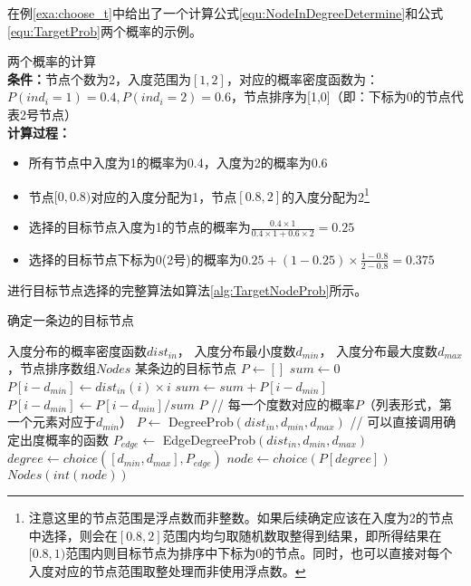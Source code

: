 \vspace{0.2cm}

在例\ref{exa:choose_t}中给出了一个计算公式\ref{equ:NodeInDegreeDetermine}和公式\ref{equ:TargetProb}两个概率的示例。

\begin{example}
  \label{exa:choose_t}
  两个概率的计算\\
  \textbf{条件：}节点个数为2，入度范围为$[1,2]$，对应的概率密度函数为：$P(ind_i=1)=0.4, P(ind_i=2)=0.6$，节点排序为[1,0]（即：下标为0的节点代表2号节点）\\
  \textbf{计算过程：}
  \begin{itemize}
    \item 所有节点中入度为1的概率为0.4，入度为2的概率为0.6
    \item 节点$[0, 0.8)$对应的入度分配为1，节点$[0.8,2]$的入度分配为2\footnote{注意这里的节点范围是浮点数而非整数。如果后续确定应该在入度为2的节点中选择，则会在$[0.8,2]$范围内均匀取随机数取整得到结果，即所得结果在$[0.8,1)$范围内则目标节点为排序中下标为0的节点。同时，也可以直接对每个入度对应的节点范围取整处理而非使用浮点数。}
    \item 选择的目标节点入度为1的节点的概率为$\frac {0.4\times 1}{0.4\times 1 + 0.6\times 2}=0.25$
    \item 选择的目标节点下标为0(2号)的概率为$0.25 + (1-0.25)\times\frac{1-0.8}{2-0.8}=0.375$
  \end{itemize}
\end{example}

进行目标节点选择的完整算法如算法\ref{alg:TargetNodeProb}所示。

\begin{algorithm}[htb]
  \caption{确定一条边的目标节点}
  \label{alg:TargetNodeProb}
  \begin{algorithmic}[1]
    \Require
      入度分布的概率密度函数$dist_{in}$，
      入度分布最小度数$d_{min}$，
      入度分布最大度数$d_{max}$，节点排序数组$Nodes$
    \Ensure 某条边的目标节点
      \State $P \gets []$
      \State $sum \gets 0$
        \State $P[i - d_{min}] \gets dist_{in}(i) \times i$
        \State $sum \gets sum + P[i - d_{min}]$
      \EndFor
        \State $P[i - d_{min}] \gets P[i - d_{min}] / sum$
      \EndFor
      \State \Return $P$ // 每一个度数对应的概率$P$（列表形式，第一个元素对应于$d_{min}$）
    \EndFunction
    \State $P \gets$ DegreeProb$(dist_{in}, d_{min}, d_{max})$ // 可以直接调用确定出度概率的函数
    \State $P_{edge} \gets$ EdgeDegreeProb$(dist_{in}, d_{min}, d_{max})$
      \State $degree \gets choice([d_{min}, d_{max}], P_{edge})$
      \State $node \gets choice(P[degree])$
      \State \Return $Nodes(int(node))$
    \EndFunction
  \end{algorithmic}
\end{algorithm}

